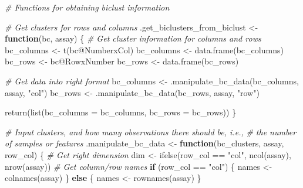 \documentclass[
]{book}
\newenvironment{Shaded}{\begin{snugshade}}{\end{snugshade}}
\newcommand{\AttributeTok}[1]{\textcolor[rgb]{0.77,0.63,0.00}{#1}}
\newcommand{\CommentTok}[1]{\textcolor[rgb]{0.56,0.35,0.01}{\textit{#1}}}
\newcommand{\ControlFlowTok}[1]{\textcolor[rgb]{0.13,0.29,0.53}{\textbf{#1}}}
\newcommand{\FunctionTok}[1]{\textcolor[rgb]{0.00,0.00,0.00}{#1}}
\newcommand{\NormalTok}[1]{#1}
\newcommand{\OtherTok}[1]{\textcolor[rgb]{0.56,0.35,0.01}{#1}}
\newcommand{\SpecialCharTok}[1]{\textcolor[rgb]{0.00,0.00,0.00}{#1}}
\newcommand{\StringTok}[1]{\textcolor[rgb]{0.31,0.60,0.02}{#1}}
\begin{document}
\begin{Shaded}
\begin{Highlighting}[]
\CommentTok{\# Functions for obtaining biclust information}

\CommentTok{\# Get clusters for rows and columns}
\NormalTok{.get\_biclusters\_from\_biclust }\OtherTok{\textless{}{-}} \ControlFlowTok{function}\NormalTok{(bc, assay) \{}
  \CommentTok{\# Get cluster information for columns and rows}
\NormalTok{  bc\_columns }\OtherTok{\textless{}{-}} \FunctionTok{t}\NormalTok{(bc}\SpecialCharTok{@}\NormalTok{NumberxCol)}
\NormalTok{  bc\_columns }\OtherTok{\textless{}{-}} \FunctionTok{data.frame}\NormalTok{(bc\_columns)}
\NormalTok{  bc\_rows }\OtherTok{\textless{}{-}}\NormalTok{ bc}\SpecialCharTok{@}\NormalTok{RowxNumber}
\NormalTok{  bc\_rows }\OtherTok{\textless{}{-}} \FunctionTok{data.frame}\NormalTok{(bc\_rows)}

  \CommentTok{\# Get data into right format}
\NormalTok{  bc\_columns }\OtherTok{\textless{}{-}} \FunctionTok{.manipulate\_bc\_data}\NormalTok{(bc\_columns, assay, }\StringTok{"col"}\NormalTok{)}
\NormalTok{  bc\_rows }\OtherTok{\textless{}{-}} \FunctionTok{.manipulate\_bc\_data}\NormalTok{(bc\_rows, assay, }\StringTok{"row"}\NormalTok{)}

  \FunctionTok{return}\NormalTok{(}\FunctionTok{list}\NormalTok{(}\AttributeTok{bc\_columns =}\NormalTok{ bc\_columns, }\AttributeTok{bc\_rows =}\NormalTok{ bc\_rows))}
\NormalTok{\}}

\CommentTok{\# Input clusters, and how many observations there should be, i.e.,}
\CommentTok{\# the number of samples or features}
\NormalTok{.manipulate\_bc\_data }\OtherTok{\textless{}{-}} \ControlFlowTok{function}\NormalTok{(bc\_clusters, assay, row\_col) \{}
  \CommentTok{\# Get right dimension}
\NormalTok{  dim }\OtherTok{\textless{}{-}} \FunctionTok{ifelse}\NormalTok{(row\_col }\SpecialCharTok{==} \StringTok{"col"}\NormalTok{, }\FunctionTok{ncol}\NormalTok{(assay), }\FunctionTok{nrow}\NormalTok{(assay))}
  \CommentTok{\# Get column/row names}
  \ControlFlowTok{if}\NormalTok{ (row\_col }\SpecialCharTok{==} \StringTok{"col"}\NormalTok{) \{}
\NormalTok{    names }\OtherTok{\textless{}{-}} \FunctionTok{colnames}\NormalTok{(assay)}
\NormalTok{  \} }\ControlFlowTok{else}\NormalTok{ \{}
\NormalTok{    names }\OtherTok{\textless{}{-}} \FunctionTok{rownames}\NormalTok{(assay)}
\NormalTok{  \}}


\end{Highlighting}
\end{Shaded}
\end{document}
